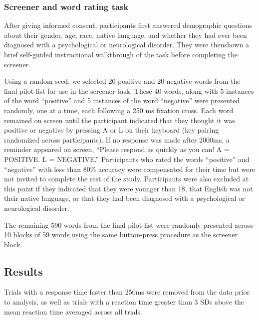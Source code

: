 \documentclass[man]{apa6}
\begin{document}
\hypertarget{screener-and-word-rating-task}{%
\subsubsection{Screener and word rating task}\label{screener-and-word-rating-task}}

After giving informed consent, participants first answered demographic questions about their gender, age, race, native language, and whether they had ever been diagnosed with a psychological or neurological disorder. They were thenshown a brief self-guided instructional walkthrough of the task before completing the screener.

Using a random seed, we selected 20 positive and 20 negative words from the final pilot list for use in the screener task. These 40 words, along with 5 instances of the word \enquote{positive} and 5 instances of the word \enquote{negative} were presented randomly, one at a time, each following a 250 ms fixation cross. Each word remained on screen until the participant indicated that they thought it was positive or negative by pressing A or L on their keyboard (key pairing randomized across participants). If no response was made after 2000ms, a reminder appeared on screen, \enquote{Please respond as quickly as you can! A = POSITIVE. L = NEGATIVE.} Participants who rated the words \enquote{positive} and \enquote{negative} with less than 80\% accuracy were compensated for their time but were not invited to complete the rest of the study. Participants were also excluded at this point if they indicated that they were younger than 18, that English was not their native language, or that they had been diagnosed with a psychological or neurological disorder.

The remaining 590 words from the final pilot list were randomly presented across 10 blocks of 59 words using the same button-press procedure as the screener block.

\hypertarget{results}{%
\subsection{Results}\label{results}}

Trials with a response time faster than 250ms were removed from the data prior to analysis, as well as trials with a reaction time greater than 3 SDs above the mean reaction time averaged across all trials.
\end{document}
